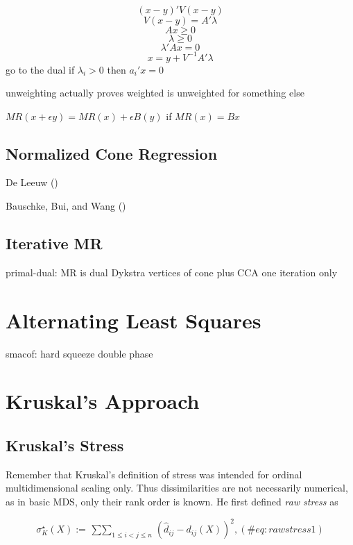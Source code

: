 \documentclass[
  12pt,
  letterpaper,
  DIV=11,
  numbers=noendperiod]{scrreprt}
\theoremstyle{remark}
\begin{document}
\[
(x-y)'V(x-y)
\] \[V(x-y)=A'\lambda\] \[Ax\geq 0\] \[\lambda\geq 0\] \[\lambda'Ax=0\]
\[x=y+V^{-1}A'\lambda\] go to the dual if \(\lambda_i>0\) then
\(a_i'x=0\)

unweighting actually proves weighted is unweighted for something else

\(MR(x+\epsilon y)=MR(x)+\epsilon B(y)\) if \(MR(x)=Bx\)

\subsection{Normalized Cone Regression}\label{mathnorcone}

De Leeuw ()

Bauschke, Bui, and Wang ()

\subsection{Iterative MR}\label{iterative-mr}

primal-dual: MR is dual Dykstra vertices of cone plus CCA one iteration
only

\section{Alternating Least Squares}\label{nmdsals}

smacof: hard squeeze double phase

\section{Kruskal's Approach}\label{nmdskruskal}

\subsection{Kruskal's Stress}\label{kruskals-stress-2}

Remember that Kruskal's definition of stress was intended for ordinal
multidimensional scaling only. Thus dissimilarities are not necessarily
numerical, as in basic MDS, only their rank order is known. He first
defined \emph{raw stress} as

\begin{equation}
\sigma^\star_K(X):=\mathop{\sum\sum}_{1\leq i<j\leq n} (\hat d_{ij}-d_{ij}(X))^2,
(\#eq:rawstress1)
\end{equation}
\end{document}
